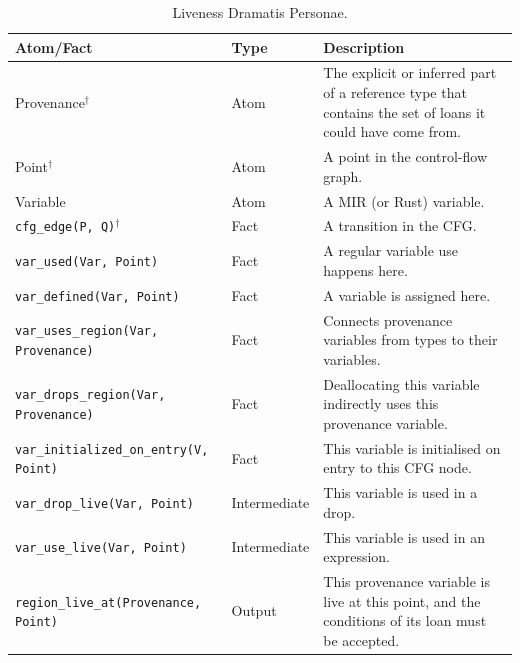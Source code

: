 \documentclass[11pt,a4paper,twoside,openany]{report}
\newcommand{\notmine}[0] {$^\dagger$}
\newcommand{\InDatalog}[1]{\texttt{#1}}
\begin{document}
{ \renewcommand{\arraystretch}{1.0}
\begin{table}[h]
  \begin{tabular}{@{}l l m{5.5cm}}
    Atom/Fact & Type & Description \\ \hline
    Provenance\notmine & Atom & The explicit or inferred part of a reference type that contains the set of loans it could have come from.  \\
    Point\notmine & Atom & A point in the control-flow graph. \\
    Variable & Atom & A MIR (or Rust) variable. \\
    \InDatalog{cfg_edge(P, Q)}\notmine & Fact & A transition in the CFG. \\
    \InDatalog{var_used(Var, Point)} & Fact & A regular variable use happens here.\\
    \InDatalog{var_defined(Var, Point)} & Fact & A variable is assigned here.\\
    \InDatalog{var_uses_region(Var, Provenance)} & Fact & Connects provenance variables from types to their variables.\\
    \InDatalog{var_drops_region(Var, Provenance)} & Fact & Deallocating this variable indirectly uses this provenance variable. \\
    \InDatalog{var_initialized_on_entry(V, Point)} & Fact & This variable is initialised on entry to this CFG node. \\
    \InDatalog{var_drop_live(Var, Point)} & Intermediate & This variable is used in a drop. \\
    \InDatalog{var_use_live(Var, Point)} & Intermediate & This variable is used in an expression. \\
    \InDatalog{region_live_at(Provenance, Point)} & Output & This provenance variable is live at this point, and the conditions of its loan must be accepted. \\
  \end{tabular}
\caption[Liveness Dramatis Personae]{Liveness Dramatis Personae.}
  \label{tab:liveness-facts-recap}
\end{table}%
}
\end{document}
